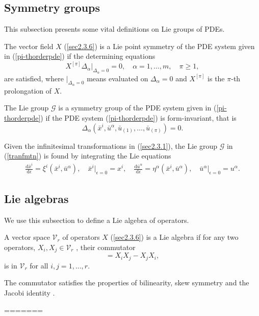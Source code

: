 \subsection{Symmetry groups }
This subsection presents some vital definitions on Lie groups of PDEs.  
\begin{defn} The vector field $X$ (\ref{sec2.3.6}) is  a Lie point symmetry of the  PDE system given in (\ref{pi-thorderpde}) if the  determining equations  
	\begin{equation}
	X^{[\pi]} \Delta_{ \alpha } \Big|_{ \Delta_{ \alpha }=0 } = 0, \quad \alpha=1,\ldots,m, \quad \pi \geq 1, \label{sec2.5.2}
	\end{equation} are satisfied, where  $\Big |_{\Delta_{ \alpha }=0}$ means evaluated on  $ \Delta_{\alpha} =0$ and $ 	X^{[\pi]}$ is the $\pi$-th prolongation of $X$.
\end{defn}
\begin{defn}The Lie group $\mathcal{G}$  is a symmetry group of the PDE system given in  (\ref{pi-thorderpde}) if the PDE system  (\ref{pi-thorderpde}) is  form-invariant, that is
	\begin{equation} \Delta_{\alpha} \left( \bar{x}^i, \bar{u}^{\alpha} , \bar{u}_{(1)}, \ldots, \bar{u}_{(\pi)}\right) =0. 
	\label{sec2.5.3}
	\end{equation}	
\end{defn}
\begin{thm} Given the infinitesimal  transformations in (\ref{sec2.3.1}), the Lie group  $\mathcal{G}$ in (\ref{tranfmtn}) is found by integrating the Lie equations
	\begin{align}
	\frac{ \mathrm{d} \bar{x}^i}{ \mathrm{d} \epsilon } = \xi^i(\bar{x}^i, \bar{u}^{\alpha}), \quad  \bar{x}^i\Big|_{\epsilon=0} = x^i,\quad
	\frac{ \mathrm{d}  \bar{u}^{\alpha} }{ \mathrm{d} \epsilon } = \eta^{\alpha}(\bar{x}^i, \bar{u}^{\alpha} ), \quad \bar{u}^{\alpha} \Big|_{ \epsilon=0} = u^{\alpha}.
	\end{align} \label{lieeqns}	
\end{thm}
\subsection{Lie algebras}
We use this subsection to define a Lie algebra of operators.
\begin{defn}   A vector space $ \mathcal{V}_{r}$ of operators \citep{ibragimov}  $X$ (\ref{sec2.3.6}) is  a Lie algebra if for any two operators, $X_i, X_j \in  \mathcal{V}_r$ , their commutator  \begin{equation} [X_i,X_j ]= X_iX_j-X_jX_i,\label{sec2.7.2} \end{equation} is in $ \mathcal{V}_r$  for all  $ i,j=1,\ldots,r$.
\end{defn}
\begin{rem}
The commutator satisfies the properties of bilinearity,  skew symmetry and  the Jacobi identity \citep{ibragimov}.	
\end{rem}
=======
